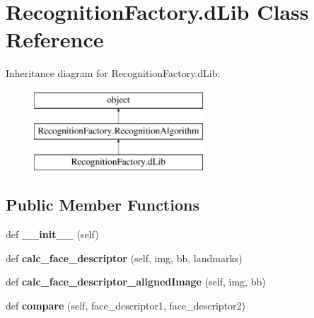 \hypertarget{classRecognitionFactory_1_1dLib}{}\section{Recognition\+Factory.\+d\+Lib Class Reference}
\label{classRecognitionFactory_1_1dLib}
Inheritance diagram for Recognition\+Factory.\+d\+Lib\+:\begin{figure}[H]
\begin{center}
\leavevmode
\includegraphics[height=3.000000cm]{classRecognitionFactory_1_1dLib}
\end{center}
\end{figure}
\subsection*{Public Member Functions}
\begin{DoxyCompactItemize}
\item 
def {\bfseries \+\_\+\+\_\+init\+\_\+\+\_\+} (self)\hypertarget{classRecognitionFactory_1_1dLib_aa5c5fbeb53475fa667bc52a438dbf293}{}\label{classRecognitionFactory_1_1dLib_aa5c5fbeb53475fa667bc52a438dbf293}

\item 
def {\bfseries calc\+\_\+face\+\_\+descriptor} (self, img, bb, landmarks)\hypertarget{classRecognitionFactory_1_1dLib_ab3ed82bd96655fad7d824e91ccf6de15}{}\label{classRecognitionFactory_1_1dLib_ab3ed82bd96655fad7d824e91ccf6de15}

\item 
def {\bfseries calc\+\_\+face\+\_\+descriptor\+\_\+aligned\+Image} (self, img, bb)\hypertarget{classRecognitionFactory_1_1dLib_a51eecfe3e4e689ca715029362bec4cea}{}\label{classRecognitionFactory_1_1dLib_a51eecfe3e4e689ca715029362bec4cea}

\item 
def {\bfseries compare} (self, face\+\_\+descriptor1, face\+\_\+descriptor2)\hypertarget{classRecognitionFactory_1_1dLib_a519b435395efe6218c3518daf350461e}{}\label{classRecognitionFactory_1_1dLib_a519b435395efe6218c3518daf350461e}

\end{DoxyCompactItemize}
